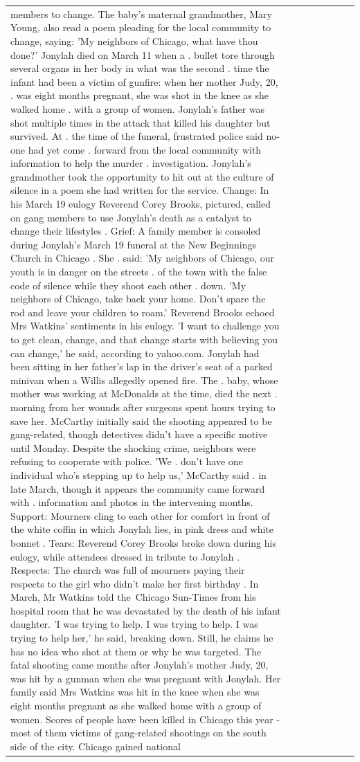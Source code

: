 \begin{table}[H]
\begin{tabular}{llrlllll}
members to change. The baby's maternal grandmother, Mary Young, also read a poem pleading for the local community to change, saying: 'My neighbors of Chicago, what have thou done?' Jonylah died on March 11 when a . bullet tore through several organs in her body in what was the second . time the infant had been a victim of gunfire: when her mother Judy, 20, . was eight months pregnant, she was shot in the knee as she walked home . with a group of women. Jonylah's father was shot multiple times in the attack that killed his daughter but survived. At . the time of the funeral, frustrated police said no-one had yet come . forward from the local community with information to help the murder . investigation. Jonylah's grandmother took the opportunity to hit out at the culture of silence in a poem she had written for the service. Change: In his March 19 eulogy Reverend Corey Brooks, pictured, called on gang members to use Jonylah's death as a catalyst to change their lifestyles . Grief: A family member is consoled during Jonylah's March 19 funeral at the New Beginnings Church in Chicago . She . said: 'My neighbors of Chicago, our youth is in danger on the streets . of the town with the false code of silence while they shoot each other . down. 'My neighbors of Chicago, take back your home. Don't spare the rod and leave your children to roam.' Reverend Brooks echoed Mrs Watkins' sentiments in his eulogy. 'I want to challenge you to get clean, change, and that change starts with believing you can change,' he said, according to yahoo.com. Jonylah had been sitting in her father's lap in the driver's seat of a parked minivan when a Willis allegedly opened fire. The . baby, whose mother was working at McDonalds at the time, died the next . morning from her wounds after surgeons spent hours trying to save her. McCarthy initially said the shooting appeared to be gang-related, though detectives didn't have a specific motive until Monday. Despite the shocking crime, neighbors were refusing to cooperate with police. 'We . don't have one individual who's stepping up to help us,' McCarthy said . in late March, though it appears the community came forward with . information and photos in the intervening months. Support: Mourners cling to each other for comfort in front of the white coffin in which Jonylah lies, in pink dress and white bonnet . Tears: Reverend Corey Brooks broke down during his eulogy, while attendees dressed in tribute to Jonylah . Respects: The church was full of mourners paying their respects to the girl who didn't make her first birthday . In March, Mr Watkins told the Chicago Sun-Times from his hospital room that he was devastated by the death of his infant daughter. 'I was trying to help. I was trying to help. I was trying to help her,' he said, breaking down. Still, he claims he has no idea who shot at them or why he was targeted. The fatal shooting came months after Jonylah's mother Judy, 20, was hit by a gunman when she was pregnant with Jonylah. Her family said Mrs Watkins was hit in the knee when she was eight months pregnant as she walked home with a group of women. Scores of people have been killed in Chicago this year - most of them victims of gang-related shootings on the south side of the city. Chicago gained national 
\end{tabular}
\end{table}
